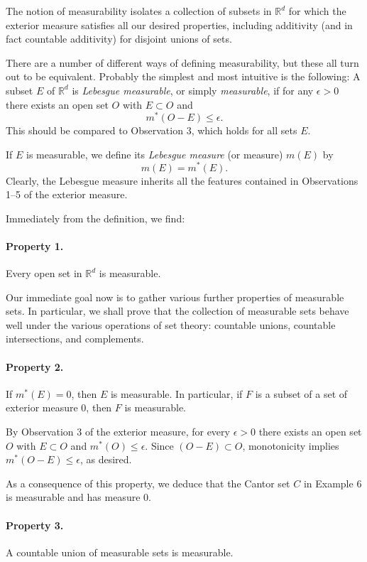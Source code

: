 \documentclass[11pt,openany]{book}
\begin{document}
The notion of measurability isolates a collection of subsets in $\mathbb{R}^d$ for which the exterior measure satisfies all our desired properties, including additivity (and in fact countable additivity) for disjoint unions of sets.

There are a number of different ways of defining measurability, but these all turn out to be equivalent. Probably the simplest and most intuitive is the following: A subset $E$ of $\mathbb{R}^d$ is \emph{Lebesgue measurable}, or simply \emph{measurable}, if for any $\epsilon>0$ there exists an open set $O$ with $E\subset O$ and
\[
 m^*(O-E)\le\epsilon.
\]
This should be compared to Observation 3, which holds for all sets $E$.

If $E$ is measurable, we define its \emph{Lebesgue measure} (or measure) $m(E)$ by
\[
 m(E)=m^*(E).
\]
Clearly, the Lebesgue measure inherits all the features contained in Observations 1--5 of the exterior measure.

Immediately from the definition, we find:

\paragraph{Property 1.} Every open set in $\mathbb{R}^d$ is measurable.

Our immediate goal now is to gather various further properties of measurable sets. In particular, we shall prove that the collection of measurable sets behave well under the various operations of set theory: countable unions, countable intersections, and complements.

\paragraph{Property 2.} If $m^*(E)=0$, then $E$ is measurable. In particular, if $F$ is a subset of a set of exterior measure $0$, then $F$ is measurable.

By Observation 3 of the exterior measure, for every $\epsilon>0$ there exists an open set $O$ with $E\subset O$ and $m^*(O)\le\epsilon$. Since $(O-E)\subset O$, monotonicity implies $m^*(O-E)\le\epsilon$, as desired.

As a consequence of this property, we deduce that the Cantor set $C$ in Example 6 is measurable and has measure $0$.

\paragraph{Property 3.} A countable union of measurable sets is measurable.
\end{document}

